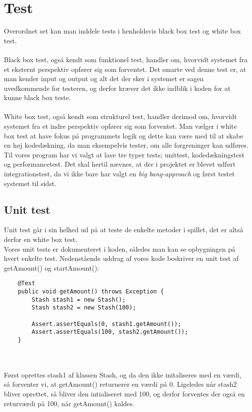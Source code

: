\chapter{Test}
Overordnet set kan man inddele tests i henholdsvis black box test og white box test.\\\\
Black box test, også kendt som funktionel test, handler om, hvorvidt systemet fra et eksternt perspektiv opfører sig som forventet.
Det smarte ved denne test er, at man kender input og output og alt det der sker i systemet er sagen uvedkommende for testeren, og derfor kræver det ikke indblik i koden for at kunne black box teste.\\\\
White box test, også kendt som strukturel test, handler derimod om, hvorvidt systemet fra et indre perspektiv opfører sig som forventet.
Man vælger i white box test at have fokus på programmets logik og dette kan være med til at skabe en høj kodedækning, da man eksempelvis tester, om alle forgreninger kan udføres.
\\Til vores program har vi valgt at lave tre typer tests; unittest, kodedækningstest og performancetest. 
Det skal hertil nævnes, at der i projektet er blevet udført integrationstest, da vi ikke bare har valgt en \textit{big bang-approach} og først testet systemet til sidst.
\section{Unit test}
Unit test går i sin helhed ud på at teste de enkelte metoder i spillet, det er altså derfor en white box test. \\
Vores unit tests er dokumenteret i koden, således man kan se opbygningen på hvert enkelte test.
Nedenstående uddrag af vores kode beskriver en unit test af getAmount() og startAmount():\\
\begin{lstlisting}
    @Test
    public void getAmount() throws Exception {
        Stash stash1 = new Stash();
        Stash stash2 = new Stash(100);

        Assert.assertEquals(0, stash1.getAmount());
        Assert.assertEquals(100, stash2.getAmount());
    }
\end{lstlisting} 
\\ \\
Først oprettes stash1 af klassen Stash, og da den ikke initaliseres med en værdi, så forventer vi, at getAmount() returnerer en værdi på 0.
Ligeledes når stash2 bliver oprettet, så bliver den intialiseret med 100, og derfor forventes der også en returværdi på 100, når getAmount() kaldes.

